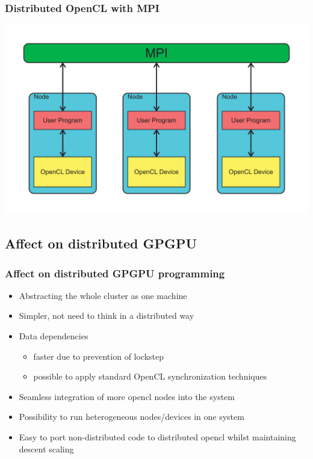 \documentclass{beamer}
\begin{document}
\begin{frame}
    \frametitle{Distributed OpenCL with MPI}
    \begin{center}
        \includegraphics[width=\textwidth]{../2014-09-25_gputalk/mpi_opencl.pdf}
    \end{center}
\end{frame}



\subsection{Affect on distributed GPGPU}

\begin{frame}
    \frametitle{Affect on distributed GPGPU programming}
    \begin{itemize}
        \item Abstracting the whole cluster as one machine
        \item Simpler, not need to think in a distributed way
        \item Data dependencies
        \begin{itemize}
            \item faster due to prevention of lockstep
            \item possible to apply standard OpenCL synchronization techniques
        \end{itemize}
        \item Seamless integration of more opencl nodes into the system
        \item Possibility to run heterogeneous nodes/devices in one system
        \item Easy to port non-distributed code to distributed opencl whilst
              maintaining descent scaling
    \end{itemize}
\end{frame}
\end{document}
